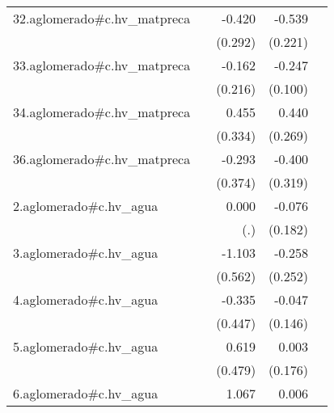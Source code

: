{\begin{longtable}{l*{4}{D{.}{.}{-1}}}
\addlinespace
32.aglomerado#c.hv\_matpreca&                     &      -0.420         &      -0.539\sym{*}  &                     \\
            &                     &     (0.292)         &     (0.221)         &                     \\
\addlinespace
33.aglomerado#c.hv\_matpreca&                     &      -0.162         &      -0.247\sym{*}  &                     \\
            &                     &     (0.216)         &     (0.100)         &                     \\
\addlinespace
34.aglomerado#c.hv\_matpreca&                     &       0.455         &       0.440         &                     \\
            &                     &     (0.334)         &     (0.269)         &                     \\
\addlinespace
36.aglomerado#c.hv\_matpreca&                     &      -0.293         &      -0.400         &                     \\
            &                     &     (0.374)         &     (0.319)         &                     \\
\addlinespace
2.aglomerado#c.hv\_agua&                     &       0.000         &      -0.076         &                     \\
            &                     &         (.)         &     (0.182)         &                     \\
\addlinespace
3.aglomerado#c.hv\_agua&                     &      -1.103\sym{*}  &      -0.258         &                     \\
            &                     &     (0.562)         &     (0.252)         &                     \\
\addlinespace
4.aglomerado#c.hv\_agua&                     &      -0.335         &      -0.047         &                     \\
            &                     &     (0.447)         &     (0.146)         &                     \\
\addlinespace
5.aglomerado#c.hv\_agua&                     &       0.619         &       0.003         &                     \\
            &                     &     (0.479)         &     (0.176)         &                     \\
\addlinespace
6.aglomerado#c.hv\_agua&                     &       1.067\sym{*}  &       0.006         &                     \\

\end{longtable}}
